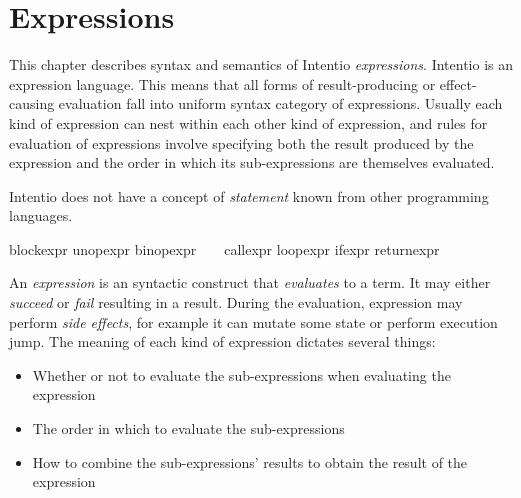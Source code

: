 \chapter{Expressions}

This chapter describes syntax and semantics of Intentio \emph{expressions}. Intentio is an expression language. This means that all forms of result-producing or effect-causing evaluation fall into uniform syntax category of expressions. Usually each kind of expression can nest within each other kind of expression, and rules for evaluation of expressions involve specifying both the result produced by the expression and the order in which its sub-expressions are themselves evaluated.

Intentio does not have a concept of \emph{statement} known from other programming languages.

\begin{bnf}
   \eq    {}                     
            \gorln {}
            \gorln blockexpr                           
            \gorln unopexpr                            
            \gorln binopexpr                           
            \gorln \term{(} \  \ \term{)}     
            \gorln callexpr                            
            \gorln loopexpr                            
            \gorln ifexpr                              
            \gorln returnexpr                          
\end{bnf}

An \emph{expression} is an syntactic construct that \emph{evaluates} to a term. It may either \emph{succeed} or \emph{fail} resulting in a result. During the evaluation, expression may perform \emph{side effects}, for example it can mutate some state or perform execution jump. The meaning of each kind of expression dictates several things:

\begin{itemize}
  \item Whether or not to evaluate the sub-expressions when evaluating the expression
  \item The order in which to evaluate the sub-expressions
  \item How to combine the sub-expressions' results to obtain the result of the expression
\end{itemize}
